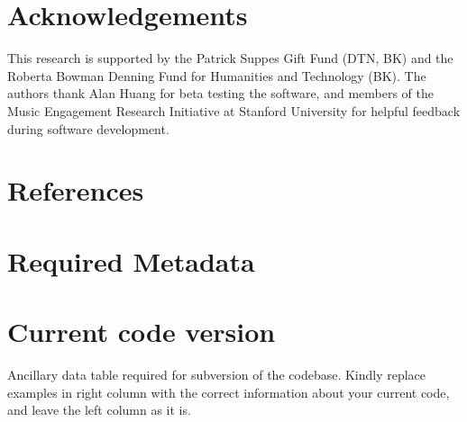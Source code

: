 \documentclass[preprint,12pt, a4paper]{elsarticle}
\begin{document}
\section*{Acknowledgements}

This research is supported by the Patrick Suppes Gift Fund (DTN, BK) and the Roberta Bowman Denning Fund for Humanities and Technology (BK). The authors thank Alan Huang for beta testing the software, and members of the Music Engagement Research Initiative at Stanford University for helpful feedback during software development.



\section{References}
  
 



\section*{Required Metadata}

\section*{Current code version}

Ancillary data table required for subversion of the codebase. Kindly replace examples in right column with the correct information about your current code, and leave the left column as it is.
\end{document}
